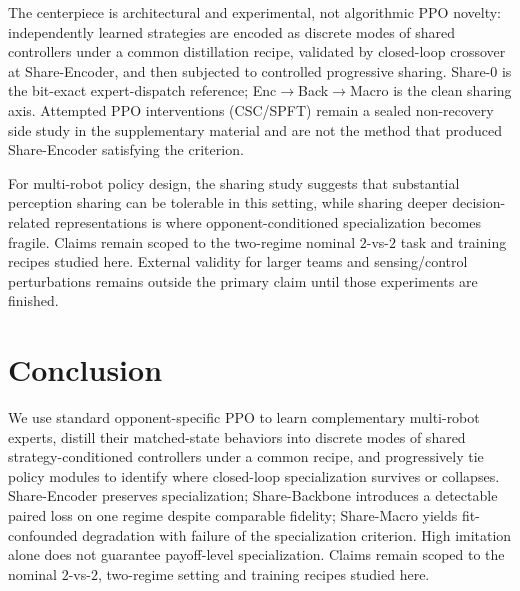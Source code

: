 \documentclass{article}
\begin{document}
The centerpiece is architectural and experimental, not algorithmic PPO novelty:
independently learned strategies are encoded as discrete modes of shared
controllers under a common distillation recipe, validated by closed-loop
crossover at Share-Encoder, and then subjected to controlled progressive
sharing. Share-0 is the bit-exact expert-dispatch reference; Enc$\rightarrow$Back$\rightarrow$Macro
is the clean sharing axis. Attempted PPO interventions (CSC/SPFT) remain a
sealed non-recovery side study in the supplementary material and are not the
method that produced Share-Encoder satisfying the criterion.

For multi-robot policy design, the sharing study suggests that substantial
perception sharing can be tolerable in this setting, while sharing deeper
decision-related representations is where opponent-conditioned specialization
becomes fragile. Claims remain scoped to the two-regime nominal $2$-vs-$2$ task
and training recipes studied here. External validity for larger teams and
sensing/control perturbations remains outside the primary claim until those
experiments are finished.

\section{Conclusion}
\label{sec:conclusion}

We use standard opponent-specific PPO to learn complementary multi-robot
experts, distill their matched-state behaviors into discrete modes of shared
strategy-conditioned controllers under a common recipe, and progressively tie
policy modules to identify where closed-loop specialization survives or
collapses. Share-Encoder preserves specialization; Share-Backbone introduces a
detectable paired loss on one regime despite comparable fidelity; Share-Macro
yields fit-confounded degradation with failure of the specialization criterion.
High imitation alone does not guarantee payoff-level specialization. Claims
remain scoped to the nominal $2$-vs-$2$, two-regime setting and training recipes
studied here.
\end{document}
